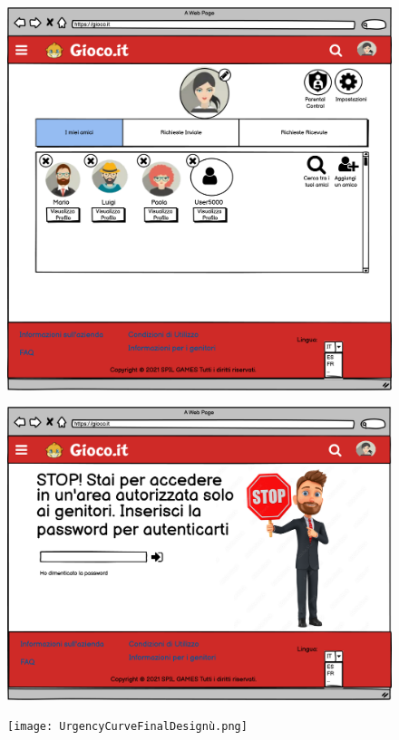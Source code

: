 \documentclass[../Report.tex]{subfiles}
\begin{document}
    \begin{figure}[H]
        \includegraphics[width=0.9\linewidth]{WAmici1 (Labeled).png}
        \centering
    \end{figure}

    \begin{figure}[H]
        \includegraphics[width=0.9\linewidth]{WParentalControlAcces (Whit Forgotten).png}
        \centering
    \end{figure}

    \begin{figure}[H]
        \texttt{[image: UrgencyCurveFinalDesignù.png]}
        \centering
    \end{figure}
    
\end{document}
